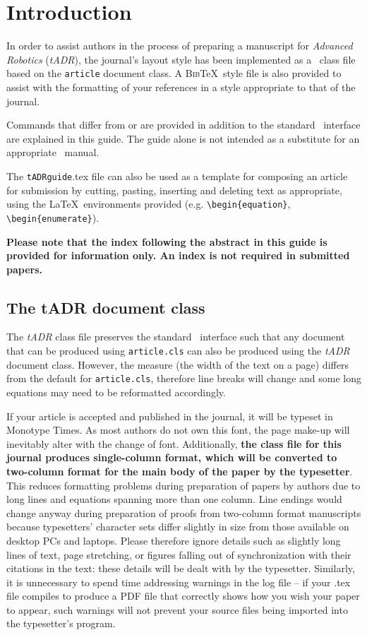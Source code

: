 \documentclass{tADR2e}
\begin{document}
\section{Introduction}

In order to assist authors in the process of preparing a manuscript for {\itshape Advanced Robotics} ({\it tADR}), the journal's layout style has been implemented as a \LaTeXe\ class file based on the {\tt article} document class. A \textsc{Bib}\TeX\ style file is also provided to assist with the formatting of your references in a style appropriate to that of the journal.

Commands that differ from or are provided in addition to the standard \LaTeXe\ interface are explained in this guide. The guide alone is not intended as a substitute for an appropriate \LaTeXe\ manual.

The {\tt tADRguide}.tex file can also be used as a template for composing an article for submission by cutting, pasting, inserting and
deleting text as appropriate, using the \LaTeX\ environments provided (e.g. \verb"\begin{equation}", \verb"\begin{enumerate}").

{\bf{Please note that the index following the abstract in this guide is provided for information only. An index is not required in submitted papers.}}

\subsection{The {\bi tADR} document class}

The {\it tADR} class file preserves the standard \LaTeXe\ interface such that any document that can
be produced using {\tt article.cls} can also be produced using the {\it tADR} document class.
However, the measure (the width of the text on a page) differs from the default for {\tt article.cls}, therefore line breaks
will change and some long equations may need to be reformatted accordingly.

If your article is accepted and published in the journal, it will be typeset in Monotype Times. As most authors do not own this font, the page make-up will inevitably alter with the change of font. Additionally, \textbf{the class file for this journal produces single-column format, which will be converted to two-column format for the main body of the paper by the typesetter}. This reduces formatting problems during preparation of papers by authors due to long lines and equations spanning more than one column. Line endings would change anyway during preparation of proofs from two-column format manuscripts because typesetters' character sets differ slightly in size from those available on desktop PCs and laptops. Please therefore ignore details such as slightly long lines of text, page stretching, or figures falling out of synchronization with their citations in the text: these details will be dealt with by the typesetter. Similarly, it is unnecessary to spend time addressing warnings in the log file -- if your .tex file compiles to produce a PDF file that correctly shows how you wish your paper to appear, such warnings will not prevent your source files being imported into the typesetter's program.
\end{document}
